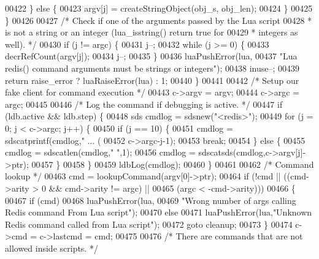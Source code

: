 \begin{DoxyCode}
{{{{{{00422         \} \textcolor{keywordflow}{else} \{
00423             argv[j] = createStringObject(obj\_s, obj\_len);
00424         \}
00425     \}
00426 
00427     \textcolor{comment}{/* Check if one of the arguments passed by the Lua script}
00428 \textcolor{comment}{     * is not a string or an integer (lua\_isstring() return true for}
00429 \textcolor{comment}{     * integers as well). */}
00430     \textcolor{keywordflow}{if} (j != argc) \{
00431         j--;
00432         \textcolor{keywordflow}{while} (j >= 0) \{
00433             decrRefCount(argv[j]);
00434             j--;
00435         \}
00436         luaPushError(lua,
00437             \textcolor{stringliteral}{"Lua redis() command arguments must be strings or integers"});
00438         inuse--;
00439         \textcolor{keywordflow}{return} raise\_error ? luaRaiseError(lua) : 1;
00440     \}
00441 
00442     \textcolor{comment}{/* Setup our fake client for command execution */}
00443     c->argv = argv;
00444     c->argc = argc;
00445 
00446     \textcolor{comment}{/* Log the command if debugging is active. */}
00447     \textcolor{keywordflow}{if} (ldb.active && ldb.step) \{
00448         sds cmdlog = sdsnew(\textcolor{stringliteral}{"<redis>"});
00449         \textcolor{keywordflow}{for} (j = 0; j < c->argc; j++) \{
00450             \textcolor{keywordflow}{if} (j == 10) \{
00451                 cmdlog = sdscatprintf(cmdlog,\textcolor{stringliteral}{" ... (%
00452                     c->argc-j-1);
00453                 \textcolor{keywordflow}{break};
00454             \} \textcolor{keywordflow}{else} \{
00455                 cmdlog = sdscatlen(cmdlog,\textcolor{stringliteral}{" "},1);
00456                 cmdlog = sdscatsds(cmdlog,c->argv[j]->ptr);
00457             \}
00458         \}
00459         ldbLog(cmdlog);
00460     \}
00461 
00462     \textcolor{comment}{/* Command lookup */}
00463     cmd = lookupCommand(argv[0]->ptr);
00464     \textcolor{keywordflow}{if} (!cmd || ((cmd->arity > 0 && cmd->arity != argc) ||
00465                    (argc < -cmd->arity)))
00466     \{
00467         \textcolor{keywordflow}{if} (cmd)
00468             luaPushError(lua,
00469                 \textcolor{stringliteral}{"Wrong number of args calling Redis command From Lua script"});
00470         \textcolor{keywordflow}{else}
00471             luaPushError(lua,\textcolor{stringliteral}{"Unknown Redis command called from Lua script"});
00472         \textcolor{keywordflow}{goto} cleanup;
00473     \}
00474     c->cmd = c->lastcmd = cmd;
00475 
00476     \textcolor{comment}{/* There are commands that are not allowed inside scripts. */}
}}}}}}}
\end{DoxyCode}
